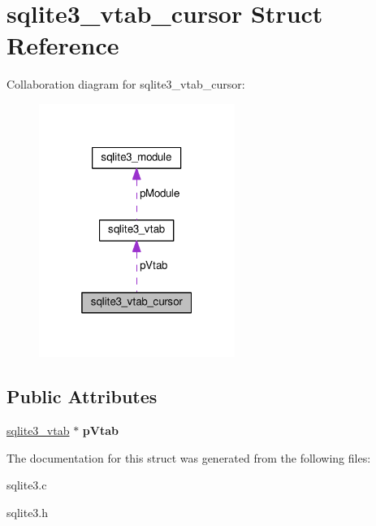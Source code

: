 \hypertarget{structsqlite3__vtab__cursor}{}\section{sqlite3\+\_\+vtab\+\_\+cursor Struct Reference}
\label{structsqlite3__vtab__cursor}


Collaboration diagram for sqlite3\+\_\+vtab\+\_\+cursor\+:\nopagebreak
\begin{figure}[H]
\begin{center}
\leavevmode
\includegraphics[width=181pt]{structsqlite3__vtab__cursor__coll__graph}
\end{center}
\end{figure}
\subsection*{Public Attributes}
\begin{DoxyCompactItemize}
\item 
\hyperlink{structsqlite3__vtab}{sqlite3\+\_\+vtab} $\ast$ {\bfseries p\+Vtab}\hypertarget{structsqlite3__vtab__cursor_a7bb57f3f9c7c618a9d6d33c6d9820bdc}{}\label{structsqlite3__vtab__cursor_a7bb57f3f9c7c618a9d6d33c6d9820bdc}

\end{DoxyCompactItemize}


The documentation for this struct was generated from the following files\+:\begin{DoxyCompactItemize}
\item 
sqlite3.\+c\item 
sqlite3.\+h\end{DoxyCompactItemize}
